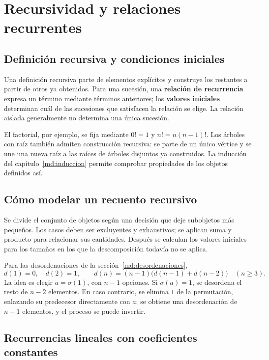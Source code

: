 \chapter{Recursividad y relaciones recurrentes}
\label{md:recurrencias}

\section{Definición recursiva y condiciones iniciales}

Una definición recursiva parte de elementos explícitos y construye
los restantes a partir de otros ya obtenidos.
Para una sucesión, una \textbf{relación de recurrencia} expresa un
término mediante términos anteriores; los \textbf{valores iniciales}
determinan cuál de las sucesiones que satisfacen la relación se elige.
La relación aislada generalmente no determina una única sucesión.

El factorial, por ejemplo, se fija mediante $0!=1$ y $n!=n(n-1)!$.
Los árboles con raíz también admiten construcción recursiva:
se parte de un único vértice y se une una nueva raíz a las raíces de
árboles disjuntos ya construidos.
La inducción del capítulo~\ref{md:induccion} permite comprobar
propiedades de los objetos definidos así.

\section{Cómo modelar un recuento recursivo}
\label{md:modelar-recurrencia}

Se divide el conjunto de objetos según una decisión que deje subobjetos
más pequeños. Los casos deben ser excluyentes y exhaustivos;
se aplican suma y producto para relacionar sus cantidades.
Después se calculan los valores iniciales para los tamaños
en los que la descomposición todavía no se aplica.

Para las desordenaciones de la sección~\ref{md:desordenaciones},
\[
 d(1)=0,\quad d(2)=1,\qquad
 d(n)=(n-1)\bigl(d(n-1)+d(n-2)\bigr)\quad(n\ge3).
\]
La idea es elegir $a=\sigma(1)$, con $n-1$ opciones.
Si $\sigma(a)=1$, se desordena el resto de $n-2$ elementos.
En caso contrario, se elimina $1$ de la permutación, enlazando
su predecesor directamente con $a$; se obtiene una desordenación
de $n-1$ elementos, y el proceso se puede invertir.

\section{Recurrencias lineales con coeficientes constantes}
\label{md:caracteristica}

